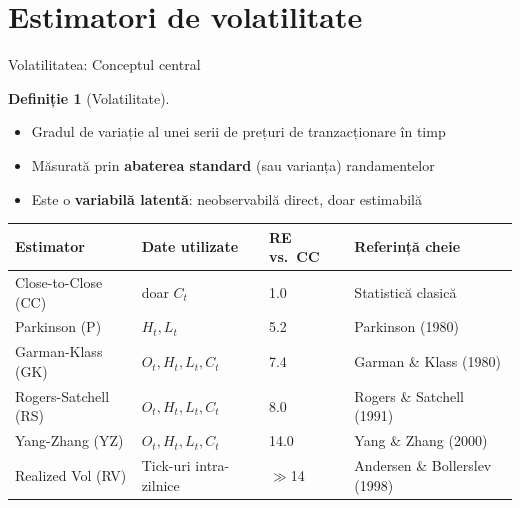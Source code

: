 \documentclass[9pt, aspectratio=169, t]{beamer}
\theoremstyle{definition}
\newtheorem{defn}{Definiție}
\begin{document}
\section{Estimatori de volatilitate}

\begin{frame}{Volatilitatea: Conceptul central}
\begin{defn}[Volatilitate]
\begin{itemize}\setlength{\itemsep}{1pt}
    \item Gradul de variație al unei serii de prețuri de tranzacționare în timp
    \item Măsurată prin \textbf{abaterea standard} (sau varianța) randamentelor
    \item Este o \textbf{variabilă latentă}: neobservabilă direct, doar estimabilă
\end{itemize}
\end{defn}
\vspace{0.1cm}
\begin{center}
{\scriptsize
\renewcommand{\arraystretch}{1.3}
\begin{tabular}{llll}
\toprule
\textbf{Estimator} & \textbf{Date utilizate} & \textbf{RE vs.\ CC} & \textbf{Referință cheie} \\
\midrule
Close-to-Close (CC) & doar $C_t$ & 1.0 & Statistică clasică \\
Parkinson (P) & $H_t, L_t$ & 5.2 & Parkinson (1980) \\
Garman-Klass (GK) & $O_t,H_t,L_t,C_t$ & 7.4 & Garman \& Klass (1980) \\
Rogers-Satchell (RS) & $O_t,H_t,L_t,C_t$ & 8.0 & Rogers \& Satchell (1991) \\
Yang-Zhang (YZ) & $O_t,H_t,L_t,C_t$ & 14.0 & Yang \& Zhang (2000) \\
Realized Vol (RV) & Tick-uri intra-zilnice & $\gg$14 & Andersen \& Bollerslev (1998) \\
\bottomrule
\end{tabular}
}
\end{center}
\end{frame}
\end{document}
